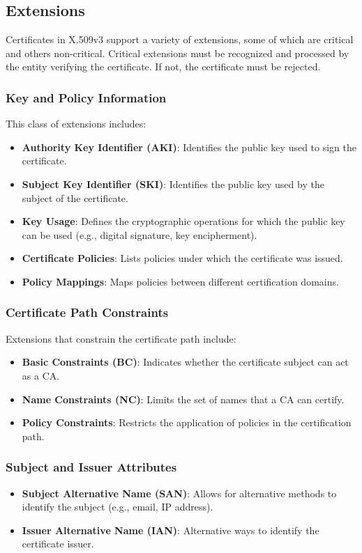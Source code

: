 \subsection{Extensions}
Certificates in X.509v3 support a variety of extensions, some of which are critical and others non-critical. Critical extensions must be recognized and processed by the entity verifying the certificate. If not, the certificate must be rejected.

\subsubsection{Key and Policy Information}
This class of extensions includes:
\begin{itemize}
    \item \textbf{Authority Key Identifier (AKI)}: Identifies the public key used to sign the certificate.
    \item \textbf{Subject Key Identifier (SKI)}: Identifies the public key used by the subject of the certificate.
    \item \textbf{Key Usage}: Defines the cryptographic operations for which the public key can be used (e.g., digital signature, key encipherment).
    \item \textbf{Certificate Policies}: Lists policies under which the certificate was issued.
    \item \textbf{Policy Mappings}: Maps policies between different certification domains.
\end{itemize}

\subsubsection{Certificate Path Constraints}
Extensions that constrain the certificate path include:
\begin{itemize}
    \item \textbf{Basic Constraints (BC)}: Indicates whether the certificate subject can act as a CA.
    \item \textbf{Name Constraints (NC)}: Limits the set of names that a CA can certify.
    \item \textbf{Policy Constraints}: Restricts the application of policies in the certification path.
\end{itemize}

\subsubsection{Subject and Issuer Attributes}
\begin{itemize}
    \item \textbf{Subject Alternative Name (SAN)}: Allows for alternative methods to identify the subject (e.g., email, IP address).
    \item \textbf{Issuer Alternative Name (IAN)}: Alternative ways to identify the certificate issuer.
\end{itemize}

